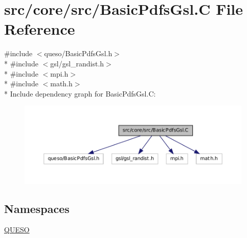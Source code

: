 \hypertarget{_basic_pdfs_gsl_8_c}{\section{src/core/src/\-Basic\-Pdfs\-Gsl.C File Reference}
\label{_basic_pdfs_gsl_8_c}
}
{\ttfamily \#include $<$queso/\-Basic\-Pdfs\-Gsl.\-h$>$}\\*
{\ttfamily \#include $<$gsl/gsl\-\_\-randist.\-h$>$}\\*
{\ttfamily \#include $<$mpi.\-h$>$}\\*
{\ttfamily \#include $<$math.\-h$>$}\\*
Include dependency graph for Basic\-Pdfs\-Gsl.\-C\-:
\nopagebreak
\begin{figure}[H]
\begin{center}
\leavevmode
\includegraphics[width=350pt]{_basic_pdfs_gsl_8_c__incl}
\end{center}
\end{figure}
\subsection*{Namespaces}
\begin{DoxyCompactItemize}
\item 
\hyperlink{namespace_q_u_e_s_o}{Q\-U\-E\-S\-O}
\end{DoxyCompactItemize}
